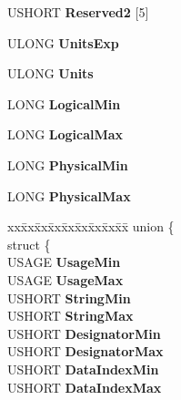 \begin{DoxyCompactItemize}
U\+S\+H\+O\+RT {\bfseries Reserved2} \mbox{[}5\mbox{]}
\item 
\mbox{\label{struct___h_i_d_p___v_a_l_u_e___c_a_p_s_ab8d362653ab89eed96badde380d6cfd8}} 
U\+L\+O\+NG {\bfseries Units\+Exp}
\item 
\mbox{\label{struct___h_i_d_p___v_a_l_u_e___c_a_p_s_acaa000c4346cb41719abde945f8e697c}} 
U\+L\+O\+NG {\bfseries Units}
\item 
\mbox{\label{struct___h_i_d_p___v_a_l_u_e___c_a_p_s_a1c4fd1df012f1c57359ef38dc4162700}} 
L\+O\+NG {\bfseries Logical\+Min}
\item 
\mbox{\label{struct___h_i_d_p___v_a_l_u_e___c_a_p_s_ae082ddcd16397d65f41fa30e28214cb0}} 
L\+O\+NG {\bfseries Logical\+Max}
\item 
\mbox{\label{struct___h_i_d_p___v_a_l_u_e___c_a_p_s_a7f7c886b003c893816b66a13ecc8b9c3}} 
L\+O\+NG {\bfseries Physical\+Min}
\item 
\mbox{\label{struct___h_i_d_p___v_a_l_u_e___c_a_p_s_a25923fb9f7b213e606d8c5d8570d373e}} 
L\+O\+NG {\bfseries Physical\+Max}
\item 
\mbox{\label{struct___h_i_d_p___v_a_l_u_e___c_a_p_s_a4506226c07522c3fc8e78ffce0c05805}} 
\begin{tabbing}
xx\=xx\=xx\=xx\=xx\=xx\=xx\=xx\=xx\=\kill
union \{\\
\>struct \{\\
\>\>USAGE {\bfseries UsageMin}\\
\>\>USAGE {\bfseries UsageMax}\\
\>\>USHORT {\bfseries StringMin}\\
\>\>USHORT {\bfseries StringMax}\\
\>\>USHORT {\bfseries DesignatorMin}\\
\>\>USHORT {\bfseries DesignatorMax}\\
\>\>USHORT {\bfseries DataIndexMin}\\
\>\>USHORT {\bfseries DataIndexMax}\\

\end{tabbing}
\end{DoxyCompactItemize}
